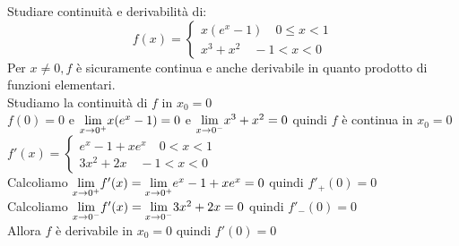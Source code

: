 \documentclass[12pt]{report}
\begin{document}
  	\begin{example}{}{}
  		Studiare continuità e derivabilità di:
  		\[
  		f(x) = \begin{cases}
  			x(e^x - 1) \quad  0 \leq x < 1 \\
  			x^3 + x^2 \quad -1 < x < 0
  		\end{cases}
  		\]
  		Per $x\neq 0, f$ è sicuramente continua e anche derivabile in quanto prodotto di funzioni elementari. \\
  		Studiamo la continuità di $f$ in $x_0 = 0$ \\
  		$f(0) = 0$ e $\mathlarger{\lim_{x \to {0^+}}}x(e^x - 1) = 0$ e $\mathlarger{\lim_{x \to {0^-}}}x^3 + x^2 = 0$ quindi $f$ è continua in $x_0 = 0$ \\
  		$f'(x) = \begin{cases}
  			e^x - 1 + xe^x \quad 0 < x < 1\\
  			3x^2 + 2x \quad -1 < x < 0
  		\end{cases}$ \\
  		Calcoliamo $\mathlarger{\lim_{x \to {0^+}}}f'(x) = \mathlarger{\lim_{x \to {0^+}}}e^x-1+xe^x = 0$ quindi $f'_+(0) = 0$ \\
  		Calcoliamo $\mathlarger{\lim_{x \to {0^-}}}f'(x) = \mathlarger{\lim_{x \to {0^-}}}3x^2 + 2x = 0$ quindi $f'_-(0) = 0$ \\
  		Allora $f$ è derivabile in $x_0 = 0$ quindi $f'(0) = 0$
  	\end{example}
\end{document}
